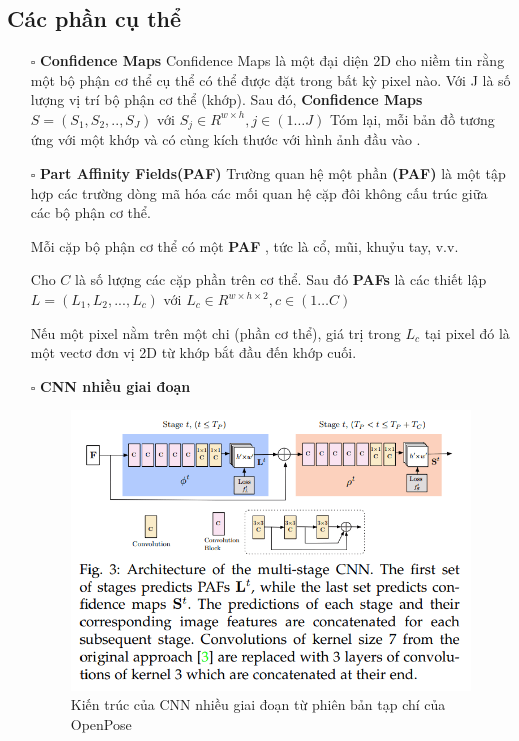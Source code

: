 \subsection{Các phần cụ thể}
\begin{itemize}
  \item[$\square$] \textbf{Confidence Maps}
  Confidence Maps là một đại diện 2D cho niềm tin rằng một bộ phận cơ thể cụ thể có thể được đặt trong bất kỳ pixel nào. Với J là số lượng vị trí bộ phận cơ thể (khớp). Sau đó, \textbf{Confidence Maps} $S = (S_1, S_2, .., S_J)$ với $S_j \in R^{w \times h},j \in (1 \ldots J)$
  Tóm lại, mỗi bản đồ tương ứng với một khớp và có cùng kích thước với hình ảnh đầu vào .

  \item[$\square$] \textbf{Part Affinity Fields(PAF)}
  Trường quan hệ một phần \textbf{(PAF)} là một tập hợp các trường dòng mã hóa các mối quan hệ cặp đôi không cấu trúc giữa các bộ phận cơ thể.

Mỗi cặp bộ phận cơ thể có một \textbf{PAF} , tức là cổ, mũi, khuỷu tay, v.v.

Cho $C$ là số lượng các cặp phần trên cơ thể. Sau đó \textbf{PAFs} là các thiết lập \textbf{$L = (L_1, L_2, ..., L_c)$} với \textbf{$L_c \in R^{w \times h \times 2},c \in (1 \ldots C)$}

Nếu một pixel nằm trên một chi (phần cơ thể), giá trị trong $L_c$ tại pixel đó là một vectơ đơn vị 2D từ khớp bắt đầu đến khớp cuối.
\item[$\square$] \textbf{CNN nhiều giai đoạn}

\FloatBarrier
\begin{figure}[htp]
\begin{center}
\includegraphics[scale=0.65]{chap3/c3_figs/CNN_m.png}
\end{center}
\caption{Kiến trúc của CNN nhiều giai đoạn từ phiên bản tạp chí của OpenPose}
\label{fig:pipelineS}
\end{figure}
\FloatBarrier


\end{itemize}
